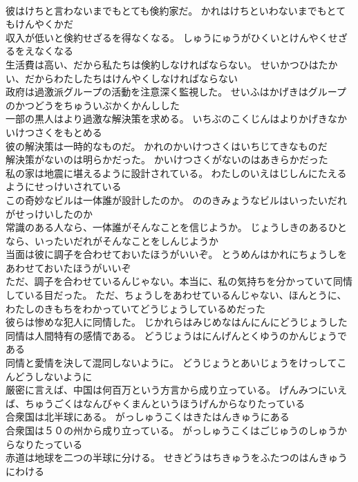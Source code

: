 \documentclass[8pt]{extreport}
\begin{document}
\begin{CJK}{UTF8}{min}
\\	彼はけちと言わないまでもとても倹約家だ。	かれはけちといわないまでもとてもけんやくかだ 
\\	収入が低いと倹約せざるを得なくなる。	しゅうにゅうがひくいとけんやくせざるをえなくなる 
\\	生活費は高い、だから私たちは倹約しなければならない。	せいかつひはたかい、だからわたしたちはけんやくしなければならない 
\\	政府は過激派グループの活動を注意深く監視した。	せいふはかげきはグループのかつどうをちゅういぶかくかんしした 
\\	一部の黒人はより過激な解決策を求める。	いちぶのこくじんはよりかげきなかいけつさくをもとめる 
\\	彼の解決策は一時的なものだ。	かれのかいけつさくはいちじてきなものだ 
\\	解決策がないのは明らかだった。	かいけつさくがないのはあきらかだった 
\\	私の家は地震に堪えるように設計されている。	わたしのいえはじしんにたえるようにせっけいされている 
\\	この奇妙なビルは一体誰が設計したのか。	ののきみょうなビルはいったいだれがせっけいしたのか 
\\	常識のある人なら、一体誰がそんなことを信じようか。	じょうしきのあるひとなら、いったいだれがそんなことをしんじようか 
\\	当面は彼に調子を合わせておいたほうがいいぞ。	とうめんはかれにちょうしをあわせておいたほうがいいぞ 
\\	ただ、調子を合わせているんじゃない。本当に、私の気持ちを分かっていて同情している目だった。	ただ、ちょうしをあわせているんじゃない、ほんとうに、わたしのきもちをわかっていてどうじょうしているめだった 
\\	彼らは惨めな犯人に同情した。	じかれらはみじめなはんにんにどうじょうした 
\\	同情は人間特有の感情である。	どうじょうはにんげんとくゆうのかんじょうである 
\\	同情と愛情を決して混同しないように。	どうじょうとあいじょうをけっしてこんどうしないように 
\\	厳密に言えば、中国は何百万という方言から成り立っている。	げんみつにいえば、ちゅうごくはなんびゃくまんというほうげんからなりたっている 
\\	合衆国は北半球にある。	がっしゅうこくはきたはんきゅうにある 
\\	合衆国は５０の州から成り立っている。	がっしゅうこくはごじゅうのしゅうからなりたっている 
\\	赤道は地球を二つの半球に分ける。	せきどうはちきゅうをふたつのはんきゅうにわける 

\end{CJK}
\end{document}
